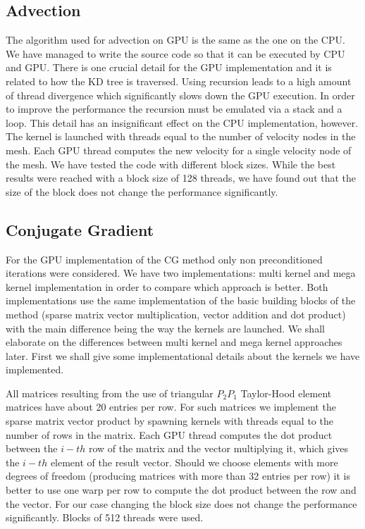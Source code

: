 \subsection{Advection}
The algorithm used for advection on GPU is the same as the one on the CPU. We have managed to write the source code so that it can be executed by CPU and GPU. There is one crucial detail for the GPU implementation and it is related to how the KD tree is traversed. Using recursion leads to a high amount of thread divergence which significantly slows down the GPU execution. In order to improve the performance the recursion must be emulated via a stack and a loop. This detail has an insignificant effect on the CPU implementation, however. The kernel is launched with threads equal to the number of velocity nodes in the mesh. Each GPU thread computes the new velocity for a single velocity node of the mesh. We have tested the code with different block sizes. While the best results were reached with a block size of 128 threads, we have found out that the size of the block does not change the performance significantly.

\subsection{Conjugate Gradient}
For the GPU implementation of the CG method only non preconditioned iterations were considered. We have two implementations: multi kernel and mega kernel implementation in order to compare which approach is better. Both implementations use the same implementation of the basic building blocks of the method (sparse matrix vector multiplication, vector addition and dot product) with the main difference being the way the kernels are launched. We shall elaborate on the differences between multi kernel and mega kernel approaches later. First we shall give some implementational details about the kernels we have implemented.

All matrices resulting from the use of triangular $P_2P_1$ Taylor-Hood element matrices have about 20 entries per row. For such matrices we implement the sparse matrix vector product by spawning kernels with threads equal to the number of rows in the matrix. Each GPU thread computes the dot product between the $i-th$ row of the matrix and the vector multiplying it, which gives the $i-th$ element of the result vector. Should we choose elements with more degrees of freedom (producing matrices with more than 32 entries per row) it is better to use one warp per row to compute the dot product between the row and the vector. For our case changing the block size does not change the performance significantly. Blocks of 512 threads were used.

